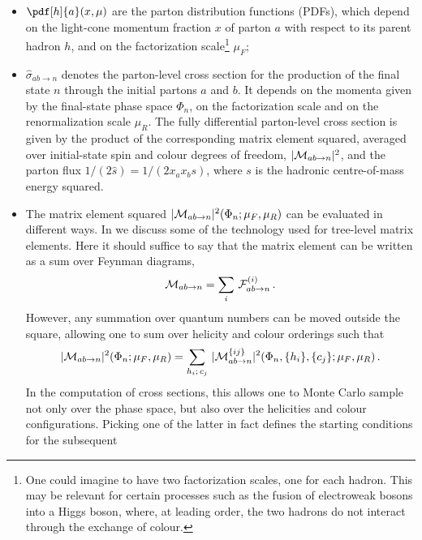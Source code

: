 \begin{itemize}
\item $\pdf[h]{a}(x,\mu)$ are the parton distribution functions
      (PDFs), which depend on the light-cone momentum fraction $x$ of parton $a$ 
      with respect to its parent hadron $h$, and on the factorization 
      scale\footnote{One could imagine to have two factorization scales,
      one for each hadron.  This may be relevant for certain processes such as 
      the fusion of electroweak bosons into a Higgs boson, where, at leading 
      order, the two hadrons do not interact through the exchange of colour.}
      $\mu_F$;
\item $\hat\sigma_{ab\to n}$ denotes the parton-level cross section for the 
      production of the final state $n$ through the initial partons $a$ and $b$.
      It depends on the momenta given by the final-state phase space $\Phi_n$, 
      on the factorization scale and on the renormalization scale $\mu_R$.
      The fully differential parton-level cross section is given by the product 
      of the corresponding matrix element squared, averaged over initial-state 
      spin and colour degrees of freedom, $|{\cal M}_{ab\to n}|^2$, and the 
      parton flux $1/(2\hat s) = 1/(2x_ax_bs)$, where $s$ is the hadronic 
      centre-of-mass energy squared.
\item The matrix element squared $|{\cal M}_{ab\to n}|^2(\Phi_n;\mu_F,\mu_R)$ can
      be evaluated in different ways.  In  we discuss
      some of the technology used for tree-level matrix elements.  Here it 
      should suffice to say that the matrix element can be written as a sum
      over Feynman diagrams, 
      \begin{equation}
      {\cal M}_{ab\to n} = \sum\limits_{i}\,{\cal F}^{(i)}_{ab\to n}\,. 
      \end{equation}
      However, any summation over quantum numbers can be moved outside the 
      square, allowing one to sum over helicity and colour orderings
      such that
      \begin{equation}
      |{\cal M}_{ab\to n}|^2(\Phi_n;\mu_F,\mu_R) = 
      \sum\limits_{h_i;\,c_j}\,|{\cal M}^{\{ij\}}_{ab\to n}|^2
      (\Phi_n,\{h_i\},\{c_j\};\mu_F,\mu_R)\,. 
      \end{equation}
      In the computation of cross sections, this allows one to Monte
      Carlo sample not only over the phase space, but also over the
      helicities and colour configurations.  Picking one of the latter
      in fact defines the starting conditions for the subsequent

\end{itemize}
